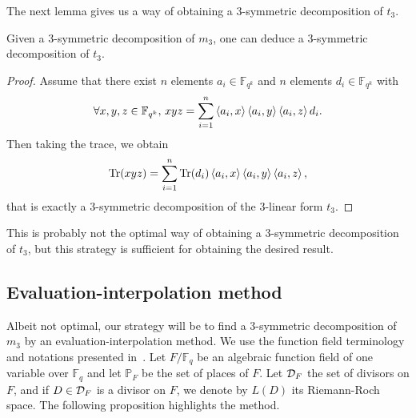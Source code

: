 \documentclass[a4paper,11pt]{article}
\begin{document}
The next lemma gives us a way of obtaining a $3$-symmetric decomposition of
$t_3$.
\begin{lm}
  Given a $3$-symmetric decomposition of $m_3$, one can deduce a $3$-symmetric
  decomposition of $t_3$.
\end{lm}
\begin{proof}
  Assume that there exist $n$ elements $a_i\in\mathbb{F}_{q^k}$ and $n$ elements
  $d_i\in\mathbb{F}_{q^k}$ with
  \[
    \forall x, y, z\in\mathbb{F}_{q^k},\,xyz =
    \sum_{i=1}^n\left\langle a_i,x\right\rangle\left\langle a_i,y\right\rangle\left\langle a_i,z\right\rangle d_i.
  \]
  Then taking the trace, we obtain
  \[
    \operatorname{Tr}(xyz) = \sum_{i=1}^n\operatorname{Tr}(d_i)\left\langle a_i,x\right\rangle\left\langle a_i,y\right\rangle\left\langle a_i,z\right\rangle,
  \]
  that is exactly a $3$-symmetric decomposition of the $3$-linear form $t_3$.
\end{proof}
\begin{rem}
  This is probably not the optimal way of obtaining a
  $3$-symmetric decomposition of $t_3$, but this strategy is sufficient for
  obtaining the desired result.
\end{rem}

\subsection{Evaluation-interpolation method}
\label{sec:eval}

Albeit not optimal, our strategy will be to find a $3$-symmetric decomposition of
$m_3$ by an evaluation-interpolation method. We use the function field
terminology and notations
presented in~\cite{Stichtenoth09}. Let $F/\mathbb{F}_q$ be an algebraic
function field of one variable over $\mathbb{F}_{q}$ and let $\mathbb{P}_F$ be the
set of places of $F$. Let $\mathcal{D}_F$ the set of
divisors on $F$, and if $D\in\mathcal{D}_F$ is a divisor on
$F$, we denote by $L(D)$ its Riemann-Roch space. The following proposition
highlights the method.
\end{document}
